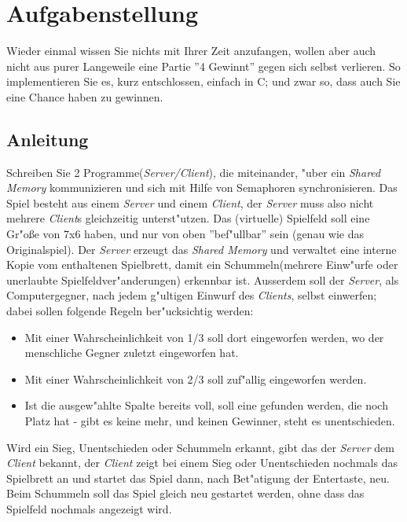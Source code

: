 




\section*{Aufgabenstellung}

Wieder einmal wissen Sie nichts mit Ihrer Zeit anzufangen, wollen aber auch nicht aus purer Langeweile eine Partie ''4 Gewinnt'' gegen sich selbst verlieren. So implementieren Sie es, kurz entschlossen, einfach in C; und zwar so, dass auch Sie eine Chance haben zu gewinnen.

\subsection*{Anleitung}
Schreiben Sie 2 Programme(\emph{Server/Client}), die miteinander, "uber ein \emph{Shared Memory} kommunizieren und sich mit Hilfe von Semaphoren synchronisieren. Das Spiel besteht aus einem \emph{Server} und einem \emph{Client}, der \emph{Server} muss also nicht mehrere \emph{Client}s gleichzeitig unterst"utzen. Das (virtuelle) Spielfeld soll eine Gr"o{\ss}e von 7x6 haben, und nur von oben ''bef"ullbar'' sein (genau wie das Originalspiel). Der \emph{Server} erzeugt das \emph{Shared Memory} und verwaltet eine interne Kopie vom enthaltenen Spielbrett, damit ein Schummeln(mehrere Einw"urfe oder unerlaubte Spielfeldver"anderungen) erkennbar ist. Ausserdem soll der \emph{Server}, als Computergegner, nach jedem g"ultigen Einwurf des \emph{Clients}, selbst einwerfen; dabei sollen folgende Regeln ber"ucksichtig werden:
\begin{itemize}
\item Mit einer Wahrscheinlichkeit von 1/3 soll dort eingeworfen werden, wo der menschliche Gegner zuletzt eingeworfen hat.
\item Mit einer Wahrscheinlichkeit von 2/3 soll zuf"allig eingeworfen werden.
\item Ist die ausgew"ahlte Spalte bereits voll, soll eine gefunden werden, die noch Platz hat - gibt es keine mehr, und keinen Gewinner, steht es unentschieden.
\end{itemize}
Wird ein Sieg, Unentschieden oder Schummeln erkannt, gibt das der \emph{Server} dem \emph{Client} bekannt, der \emph{Client} zeigt bei einem Sieg oder Unentschieden nochmals das Spielbrett an und startet das Spiel dann, nach Bet"atigung der Entertaste, neu. Beim Schummeln soll das Spiel gleich neu gestartet werden, ohne dass das Spielfeld nochmals angezeigt wird.

